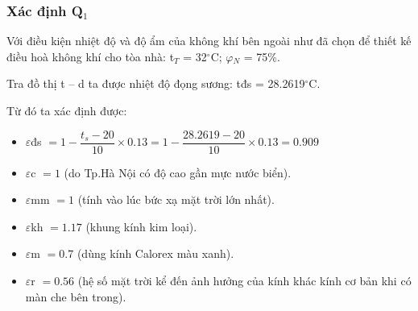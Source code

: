 \subsubsection{Xác định Q$_{1}$}
Với điều kiện nhiệt độ và độ ẩm của không khí bên ngoài như đã chọn để thiết kế điều hoà không khí cho tòa nhà: t$_{T}$ = 32$^{\circ}$C; {\large $\varphi$}$_{N}$ = 75\%.

Tra đồ thị t – d ta được nhiệt độ đọng sương: {\large t}{\scriptsize đs} = 28.2619$^{\circ}$C.

Từ đó ta xác định được:
\begin{itemize}[leftmargin=2.2cm]
	\item {\Large $\varepsilon$}{\scriptsize đs} $= 1 -\dfrac{t_{s} - 20}{10}\times0.13 = 1 -\dfrac{28.2619 - 20}{10}\times0.13 = 0.909$
	
	\item {\Large $\varepsilon$}{\scriptsize c} $= 1$ (do Tp.Hà Nội có độ cao gần mực nước biển).
	
	\item {\Large $\varepsilon$}{\scriptsize mm} $= 1$ (tính vào lúc bức xạ mặt trời lớn nhất).
	
	\item {\Large $\varepsilon$}{\scriptsize kh} $= 1.17$ (khung kính kim loại).
	
	\item {\Large $\varepsilon$}{\scriptsize m} $= 0.7$ (dùng kính Calorex màu xanh).
	
	\item {\Large $\varepsilon$}{\scriptsize r} $= 0.56$ (hệ số mặt trời kể đến ảnh hưởng của kính khác kính cơ bản khi có màn che bên trong).
\end{itemize}

